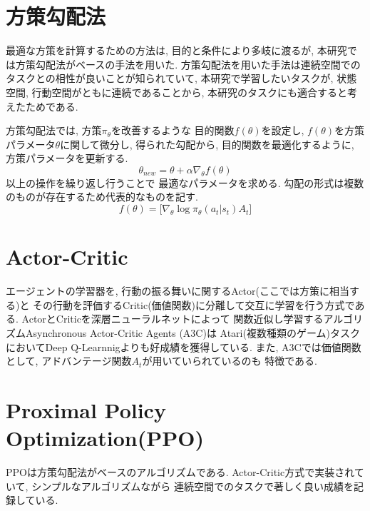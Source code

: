 \documentclass[../main]{subfiles}
\begin{document}
\section{方策勾配法}
最適な方策を計算するための方法は, 
目的と条件により多岐に渡るが, 
本研究では方策勾配法がベースの手法を用いた.
方策勾配法を用いた手法は連続空間でのタスクとの相性が良いことが知られていて, 
本研究で学習したいタスクが, 
状態空間, 行動空間がともに連続であることから, 
本研究のタスクにも適合すると考えたためである.

方策勾配法では, 方策$\pi_\theta$を改善するような
目的関数$f(\theta)$を設定し, 
$f(\theta)$を方策パラメータ$\theta$に関して微分し, 
得られた勾配から, 目的関数を最適化するように, 
方策パラメータを更新する.
\begin{equation}
\theta_{new} = \theta + \alpha \nabla_{\theta} f(\theta)
\end{equation}
以上の操作を繰り返し行うことで
最適なパラメータを求める.
勾配の形式は複数のものが存在するため代表的なものを記す.
\begin{equation}
f(\theta) = 
\mathbb[\nabla_\theta \log{\pi_\theta(a_t|s_t)}A_t]
\end{equation}


\section{Actor-Critic}
エージェントの学習器を, 
行動の振る舞いに関するActor(ここでは方策に相当する)と
その行動を評価するCritic(価値関数)に分離して交互に学習を行う方式である.
ActorとCriticを深層ニューラルネットによって 
関数近似し学習するアルゴリズムAsynchronous Actor-Critic Agents
(A3C\cite{ref:actor_critic})は
Atari(複数種類のゲーム)タスクにおいてDeep Q-Learnnigよりも好成績を獲得している.
また, A3Cでは価値関数として, 
アドバンテージ関数$A_t$が用いていられているのも
特徴である.


\section{Proximal Policy Optimization(PPO)\cite{ref:proximal_policy}}
PPOは方策勾配法がベースのアルゴリズムである.
Actor-Critic方式で実装されていて, 
シンプルなアルゴリズムながら
連続空間でのタスクで著しく良い成績を記録している.
\end{document}
